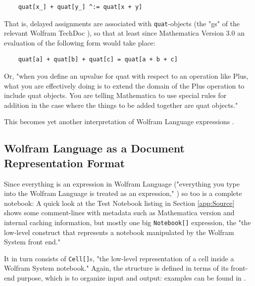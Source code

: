 \begin{verbatim}
    quat[x_] + quat[y_] ^:= quat[x + y] 
\end{verbatim}

That is, delayed assignments are associated with \lstinline+quat+-objects (the "gs" of the relevant Wolfram TechDoc \cite[in section Associating Definitions with Different Symbols]{wolfram_research_inc_transformation_2024}), so that at least since Mathematica Version 3.0 an evaluation of the following form would take place:

\begin{verbatim}
    quat[a] + quat[b] + quat[c] = quat[a + b + c]
\end{verbatim}

Or, "when you define an upvalue for quat with respect to an operation like Plus, what you are effectively doing is to extend the domain of the Plus operation to include quat objects. You are telling Mathematica to use special rules for addition in the case where the things to be added together are quat objects." \cite[At the end of section 2.4.10, Associating Definitions with Different Symbols]{noauthor_wolfram_nodate} 

This becomes yet another interpretation of Wolfram Language expressions \cite[The Meaning of Expressions]{wolfram_research_inc_expressionswolfram_2024}.

\subsection{Wolfram Language as a Document Representation Format}

Since everything is an expression in Wolfram Language ("everything you type into the Wolfram Language is treated as an expression," \cite{noauthor_expressionswolfram_nodate}) so too is a complete notebook: A quick look at the Test Notebook listing in Section \ref{app:Source} shows some comment-lines with metadata such as Mathematica version and internal caching information, but mostly one big \lstinline+Notebook[]+ expression, the "the low‐level construct that represents a notebook manipulated by the Wolfram System front end." \cite{noauthor_notebookwolfram_nodate}

It in turn consists of \lstinline+Cell[]+s, "the low-level representation of a cell inside a Wolfram System notebook." \cite{noauthor_cellwolfram_nodate} Again, the structure is defined in terms of its front-end purpose, which is to organize input and output: examples can be found in \cite{noauthor_wolfram_nodate}. 

